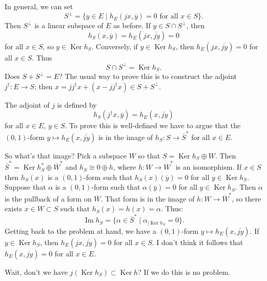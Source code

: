 \documentclass[10pt,a4paper]{article}
\def\ov#1{\overline{#1}}
\DeclareMathOperator{\im}{Im}
\DeclareMathOperator{\Ker}{Ker}
\begin{document}
In general, we can set
\[
S^\perp =
\{ y \in E \mid h_E(jx, \ov y) = 0 \text{ for all $x \in S$}\}.
\]
Then $S^\perp$ is a linear subspace of $E$ as before. If $y \in S \cap S^\perp$, then
\[
h_S(x, \ov y) = h_E(jx, \ov{jy}) = 0
\]
for all $x \in S$, so $y \in \Ker h_S$. Conversely, if $y \in \Ker h_S$, then $h_E(jx, \ov{jy}) = 0$ for all $x \in S$. Thus
\[
S \cap S^\perp = \Ker h_S.
\]
Does $S + S^\perp = E$? The usual way to prove this is to construct the adjoint $j^\dagger : E \to S$; then $x = jj^\dagger x + (x - jj^\dagger x) \in S + S^\perp$.

The adjoint of $j$ is defined by
\[
h_S(j^\dagger x, \ov{y})
= h_E(x, \ov{jy})
\]
for all $x \in E$, $y \in S$. To prove this is well-defined we have to argue that the $(0,1)$-form $y \mapsto h_E(x, \ov {jy})$ is in the image of $h_S : S \to \ov S^*$ for all $x \in E$.

So what's that image? Pick a subspace $W$ so that $S = \Ker h_S \oplus W$. Then $\ov S^* = \ov{\Ker h_S^*} \oplus \ov W^*$ and $h_S \cong 0 \oplus h$, where $h : W \to \ov W^*$ is an isomorphism. If $x \in S$ then $h_S(x)$ is a $(0,1)$-form such that $h_S(x)(\ov y) = 0$ for all $y \in \Ker h_S$. Suppose that $\alpha$ is a $(0,1)$-form such that $\alpha(\ov y) = 0$ for all $y \in \Ker h_S$. Then $\alpha$ is the pullback of a form on $\ov W$. That form is in the image of $h : W \to \ov W^*$, so there exists $x \in W \subset S$ such that $h_S(x) = h(x) = \alpha$. Thus:
\[
\im h_S
= \{ \alpha \in \ov S^* \mid \alpha_{|\Ker h_S} = 0 \}.
\]
Getting back to the problem at hand, we have a $(0,1)$-form $y \mapsto h_E(x, \ov{jy})$. If $y \in \Ker h_S$, then $h_E(jx, \ov{jy}) = 0$ for all $x \in S$. I don't think it follows that $h_E(x, \ov{jy}) = 0$ for all $x \in E$.

Wait, don't we have $j(\Ker h_S) \subset \Ker h$? If we do this is no problem.





\end{document}
